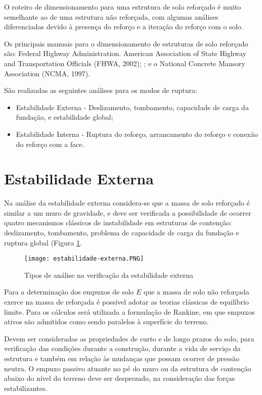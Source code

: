 O roteiro de dimensionamento para uma estrutura de solo reforçado é muito semelhante ao de uma estrutura não reforçada, com algumas análises diferenciadas devido à presença do reforço e a iteração do reforço com o solo.

Os principais manuais para o dimensionamento de estruturas de solo reforçado são: Federal Highway Administration. American Association of State Highway and Transportation Officials (FHWA, 2002);  \cite{aashto}; e o National Concrete Mansory Association (NCMA, 1997).


São realizadas as seguintes análises para os modos de ruptura:

\begin{itemize}
    \item Estabilidade Externa - Deslizamento, tombamento, capacidade de carga da fundação, e estabilidade global;
    \item Estabilidade Interna - Ruptura do reforço, arrancamento do reforço e conexão do reforço com a face.
\end{itemize}

\section{Estabilidade Externa}

Na análise da estabilidade externa considera-se que a massa de solo reforçado é similar a um muro de gravidade, e deve ser verificada a possibilidade de ocorrer quatro mecanismos clássicos de instabilidade em estruturas de contenção: deslizamento, tombamento, problema de capacidade de carga da fundação e ruptura global (Figura \ref{fig:estabilidade-externa}.

\begin{figure}[htb]
 \caption{Tipos de análise na verificação da estabilidade externa}
 \label{fig:estabilidade-externa}
 \centering
 \texttt{[image: estabilidade-externa.PNG]}
\end{figure}

Para a determinação dos empuxos de solo $E$ que a massa de solo não reforçada exerce na massa de reforçada é possível adotar as teorias clássicas de equilíbrio limite. Para os cálculos será utilizada a formulação de Rankine, em que empuxos ativos são admitidos como sendo paralelos à superfície do terreno.

Devem ser consideradas as propriedades de curto e de longo prazos do solo, para verificação das condições durante a construção, durante a vida de serviço da estrutura e também em relação às mudanças que possam ocorrer de pressão neutra. O empuxo passivo atuante no pé do muro ou da estrutura de contenção abaixo do nível do terreno deve ser desprezado, na consideração das forças estabilizantes.

